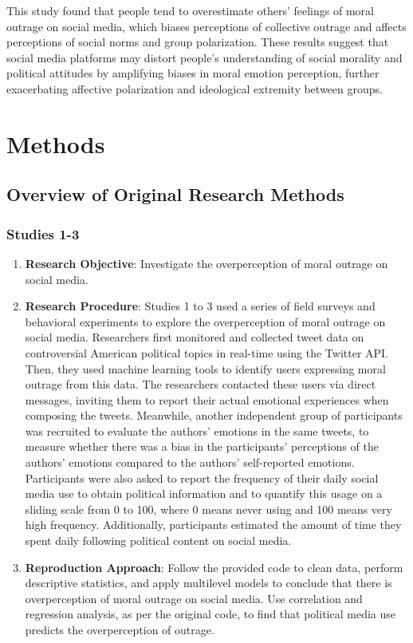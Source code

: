\documentclass[
  man]{apa6}
\providecommand{\tightlist}{%
  \setlength{\itemsep}{0pt}\setlength{\parskip}{0pt}}
\begin{document}
This study found that people tend to overestimate others' feelings of moral outrage on social media, which biases perceptions of collective outrage and affects perceptions of social norms and group polarization. These results suggest that social media platforms may distort people's understanding of social morality and political attitudes by amplifying biases in moral emotion perception, further exacerbating affective polarization and ideological extremity between groups.

\hypertarget{methods}{%
\section{Methods}\label{methods}}

\hypertarget{overview-of-original-research-methods}{%
\subsection{Overview of Original Research Methods}\label{overview-of-original-research-methods}}

\hypertarget{studies-1-3}{%
\subsubsection{Studies 1-3}\label{studies-1-3}}

\begin{enumerate}
\def\labelenumi{\arabic{enumi}.}
\tightlist
\item
  \textbf{Research Objective}:
  Investigate the overperception of moral outrage on social media.
\item
  \textbf{Research Procedure}:
  Studies 1 to 3 used a series of field surveys and behavioral experiments to explore the overperception of moral outrage on social media. Researchers first monitored and collected tweet data on controversial American political topics in real-time using the Twitter API. Then, they used machine learning tools to identify users expressing moral outrage from this data. The researchers contacted these users via direct messages, inviting them to report their actual emotional experiences when composing the tweets. Meanwhile, another independent group of participants was recruited to evaluate the authors' emotions in the same tweets, to measure whether there was a bias in the participants' perceptions of the authors' emotions compared to the authors' self-reported emotions. Participants were also asked to report the frequency of their daily social media use to obtain political information and to quantify this usage on a sliding scale from 0 to 100, where 0 means never using and 100 means very high frequency. Additionally, participants estimated the amount of time they spent daily following political content on social media.
\item
  \textbf{Reproduction Approach}:
  Follow the provided code to clean data, perform descriptive statistics, and apply multilevel models to conclude that there is overperception of moral outrage on social media. Use correlation and regression analysis, as per the original code, to find that political media use predicts the overperception of outrage.
\end{enumerate}
\end{document}
